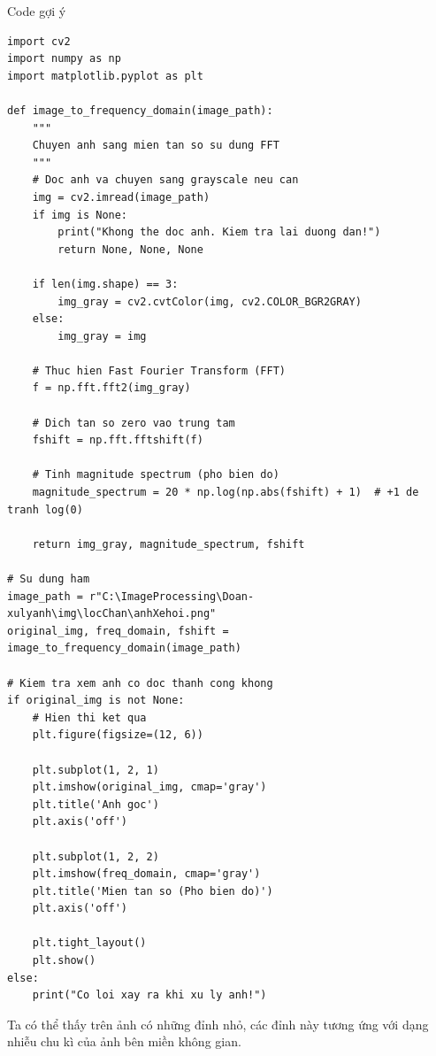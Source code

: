 \documentclass[12pt,a4paper]{report}
\numberwithin{equation}{section}
\theoremstyle{definition} %
\begin{document}
Code gợi ý
\begin{lstlisting}
import cv2
import numpy as np
import matplotlib.pyplot as plt

def image_to_frequency_domain(image_path):
    """
    Chuyen anh sang mien tan so su dung FFT
    """
    # Doc anh va chuyen sang grayscale neu can
    img = cv2.imread(image_path)
    if img is None:
        print("Khong the doc anh. Kiem tra lai duong dan!")
        return None, None, None
    
    if len(img.shape) == 3:
        img_gray = cv2.cvtColor(img, cv2.COLOR_BGR2GRAY)
    else:
        img_gray = img
    
    # Thuc hien Fast Fourier Transform (FFT)
    f = np.fft.fft2(img_gray)
    
    # Dich tan so zero vao trung tam
    fshift = np.fft.fftshift(f)
    
    # Tinh magnitude spectrum (pho bien do)
    magnitude_spectrum = 20 * np.log(np.abs(fshift) + 1)  # +1 de tranh log(0)
    
    return img_gray, magnitude_spectrum, fshift

# Su dung ham
image_path = r"C:\ImageProcessing\Doan-xulyanh\img\locChan\anhXehoi.png"
original_img, freq_domain, fshift = image_to_frequency_domain(image_path)

# Kiem tra xem anh co doc thanh cong khong
if original_img is not None:
    # Hien thi ket qua
    plt.figure(figsize=(12, 6))

    plt.subplot(1, 2, 1)
    plt.imshow(original_img, cmap='gray')
    plt.title('Anh goc')
    plt.axis('off')

    plt.subplot(1, 2, 2)
    plt.imshow(freq_domain, cmap='gray')
    plt.title('Mien tan so (Pho bien do)')
    plt.axis('off')

    plt.tight_layout()
    plt.show()
else:
    print("Co loi xay ra khi xu ly anh!")
\end{lstlisting}

Ta có thể thấy trên ảnh có những đỉnh nhỏ, các đỉnh này tương ứng với dạng nhiễu chu kì của ảnh bên miền không gian.\\
\end{document}
